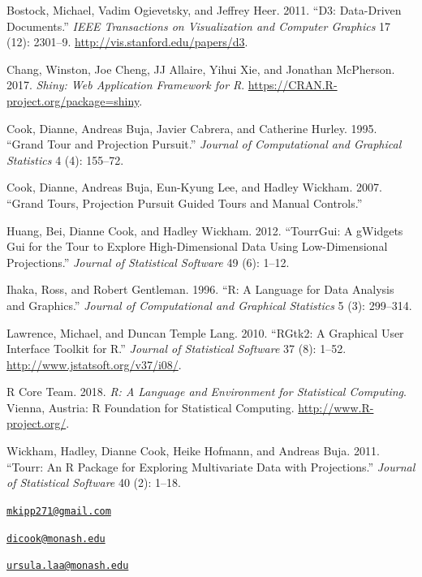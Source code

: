 \hypertarget{refs}{}
\hypertarget{ref-D3}{}
Bostock, Michael, Vadim Ogievetsky, and Jeffrey Heer. 2011. ``D3:
Data-Driven Documents.'' \emph{IEEE Transactions on Visualization and
Computer Graphics} 17 (12): 2301--9.
\url{http://vis.stanford.edu/papers/d3}.

\hypertarget{ref-shiny}{}
Chang, Winston, Joe Cheng, JJ Allaire, Yihui Xie, and Jonathan
McPherson. 2017. \emph{Shiny: Web Application Framework for R}.
\url{https://CRAN.R-project.org/package=shiny}.

\hypertarget{ref-gt_pp}{}
Cook, Dianne, Andreas Buja, Javier Cabrera, and Catherine Hurley. 1995.
``Grand Tour and Projection Pursuit.'' \emph{Journal of Computational
and Graphical Statistics} 4 (4): 155--72.

\hypertarget{ref-gt_pp_mc}{}
Cook, Dianne, Andreas Buja, Eun-Kyung Lee, and Hadley Wickham. 2007.
``Grand Tours, Projection Pursuit Guided Tours and Manual Controls.''

\hypertarget{ref-tourrGui}{}
Huang, Bei, Dianne Cook, and Hadley Wickham. 2012. ``TourrGui: A
gWidgets Gui for the Tour to Explore High-Dimensional Data Using
Low-Dimensional Projections.'' \emph{Journal of Statistical Software} 49
(6): 1--12.

\hypertarget{ref-ihaka:1996}{}
Ihaka, Ross, and Robert Gentleman. 1996. ``R: A Language for Data
Analysis and Graphics.'' \emph{Journal of Computational and Graphical
Statistics} 5 (3): 299--314.

\hypertarget{ref-RGtk2}{}
Lawrence, Michael, and Duncan Temple Lang. 2010. ``RGtk2: A Graphical
User Interface Toolkit for R.'' \emph{Journal of Statistical Software}
37 (8): 1--52. \url{http://www.jstatsoft.org/v37/i08/}.

\hypertarget{ref-R}{}
R Core Team. 2018. \emph{R: A Language and Environment for Statistical
Computing}. Vienna, Austria: R Foundation for Statistical Computing.
\url{http://www.R-project.org/}.

\hypertarget{ref-tourr}{}
Wickham, Hadley, Dianne Cook, Heike Hofmann, and Andreas Buja. 2011.
``Tourr: An R Package for Exploring Multivariate Data with
Projections.'' \emph{Journal of Statistical Software} 40 (2): 1--18.

\address{%
Michael Kipp\\
Monash University\\
Department of Econometrics and Business Statistics\\
}
\href{mailto:mkipp271@gmail.com}{\nolinkurl{mkipp271@gmail.com}}

\address{%
Dianne Cook\\
Monash University\\
Department of Econometrics and Business Statistics\\
}
\href{mailto:dicook@monash.edu}{\nolinkurl{dicook@monash.edu}}

\address{%
Ursula Laa\\
Monash University\\
School of Physics and Astronomy\\
}
\href{mailto:ursula.laa@monash.edu}{\nolinkurl{ursula.laa@monash.edu}}

